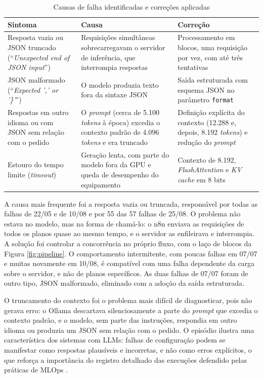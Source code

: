 \begin{table}[H]
\centering
\caption{Causas de falha identificadas e correções aplicadas}
\label{tab:falhas}
\footnotesize
\begin{tabular}{@{}L{3.4cm}L{4.7cm}L{6.3cm}@{}}
\toprule
{}
\textbf{Sintoma} & \textbf{Causa} & \textbf{Correção} \\ \midrule
Resposta vazia ou JSON truncado (``\textit{Unexpected end of JSON input}'') & Requisições simultâneas sobrecarregavam o servidor de inferência, que interrompia respostas & Processamento em blocos, uma requisição por vez, com até três tentativas \\
JSON malformado (``\textit{Expected ',' or '\}'}'') & O modelo produzia texto fora da sintaxe JSON & Saída estruturada com esquema JSON no parâmetro \texttt{format} \\
Respostas em outro idioma ou com JSON sem relação com o pedido & O \textit{prompt} (cerca de 5.100 \textit{tokens} à época) excedia o contexto padrão de 4.096 \textit{tokens} e era truncado & Definição explícita do contexto (12.288 e, depois, 8.192 \textit{tokens}) e redução do \textit{prompt} \\
Estouro do tempo limite (\textit{timeout}) & Geração lenta, com parte do modelo fora da GPU e queda de desempenho do equipamento & Contexto de 8.192, \textit{FlashAttention} e \textit{KV cache} em 8 bits \\ \bottomrule
\end{tabular}
\end{table}

A causa mais frequente foi a resposta vazia ou truncada, responsável por todas as falhas de 22/05 e de 10/08 e por 55 das 57 falhas de 25/08. O problema não estava no modelo, mas na forma de chamá-lo: o n8n enviava as requisições de todos os planos quase ao mesmo tempo, e o servidor as enfileirava e interrompia. A solução foi controlar a concorrência no próprio fluxo, com o laço de blocos da Figura \ref{fig:pipeline}. O comportamento intermitente, com poucas falhas em 07/07 e muitas novamente em 10/08, é compatível com uma falha dependente da carga sobre o servidor, e não de planos específicos. As duas falhas de 07/07 foram de outro tipo, JSON malformado, eliminado com a adoção da saída estruturada.

O truncamento do contexto foi o problema mais difícil de diagnosticar, pois não gerava erro: o Ollama descartava silenciosamente a parte do \textit{prompt} que excedia o contexto padrão, e o modelo, sem parte das instruções, respondia em outro idioma ou produzia um JSON sem relação com o pedido. O episódio ilustra uma característica dos sistemas com LLMs: falhas de configuração podem se manifestar como respostas plausíveis e incorretas, e não como erros explícitos, o que reforça a importância do registro detalhado das execuções defendido pelas práticas de MLOps \cite{Kreuzberger2023}.

